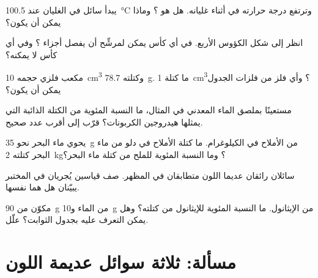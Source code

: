 \begin{exercise}[$\star\star$]\label{exo:g6:pure-substances-and-mixtures:6}
يبدأ سائل في الغليان عند \qty{100.5}{\celsius} وترتفع درجة حرارته في أثناء
غليانه. هل هو ؟ وماذا يمكن أن يكون؟
\end{exercise}

\begin{exercise}[$\star\star$]\label{exo:g6:pure-substances-and-mixtures:7}
انظر إلى شكل الكؤوس الأربع. في أي كأس يمكن لمرشِّح أن يفصل أجزاء
؟ وفي أي كأس لا يمكنه؟
\end{exercise}

\begin{exercise}[$\star\star$]\label{exo:g6:pure-substances-and-mixtures:8}
مكعب فلزي حجمه \qty{10}{cm^3} وكتلته \qty{78.7}{g}. ما كتلة
\qty{1}{cm^3}؟ وأي فلز من فلزات الجدول يمكن أن يكون؟
\end{exercise}

\begin{exercise}[$\star\star$]\label{exo:g6:pure-substances-and-mixtures:9}
مستعينًا بملصق الماء المعدني في المثال، ما النسبة المئوية من الكتلة الذائبة
التي يمثلها هيدروجين الكربونات؟ قرّب إلى أقرب عدد صحيح.
\end{exercise}

\begin{exercise}[$\star\star$]\label{exo:g6:pure-substances-and-mixtures:10}
يحوي ماء البحر نحو \qty{35}{g} من الأملاح في الكيلوغرام. ما كتلة
الأملاح في دلو من ماء البحر كتلته \qty{2}{kg}؟ وما النسبة المئوية للملح من
كتلة ماء البحر؟
\end{exercise}

\begin{exercise}[$\star\star\star$]\label{exo:g6:pure-substances-and-mixtures:11}
سائلان رائقان عديما اللون متطابقان في المظهر. صف قياسين يُجريان في
المختبر يبيّنان هل هما 
نفسها.
\end{exercise}

\begin{exercise}[$\star\star\star$]\label{exo:g6:pure-substances-and-mixtures:12}
 مكوّن من \qty{90}{g} من الماء و\qty{10}{g} من الإيثانول.
ما النسبة المئوية للإيثانول من كتلته؟ وهل يمكن التعرف عليه بجدول
الثوابت؟ علّل.
\end{exercise}

\section{مسألة: ثلاثة سوائل عديمة اللون}

